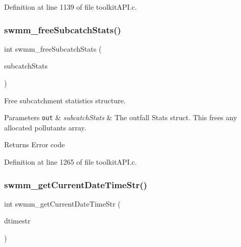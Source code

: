 Definition at line 1139 of file toolkit\+A\+P\+I.\+c.

\mbox{\label{group__tkfuncs_gaf24dfaf8bcd92298782f2449aa18a2f5}} 
\subsubsection{\texorpdfstring{swmm\+\_\+free\+Subcatch\+Stats()}{swmm\_freeSubcatchStats()}}
{\footnotesize\ttfamily int swmm\+\_\+free\+Subcatch\+Stats (\begin{DoxyParamCaption}\item[{\hyperlink{struct_s_m___subcatch_stats}{S\+M\+\_\+\+Subcatch\+Stats} $\ast$}]{subcatch\+Stats }\end{DoxyParamCaption})}



Free subcatchment statistics structure. 


\begin{DoxyParams}[1]{Parameters}
\mbox{\tt out}  & {\em subcatch\+Stats} & The outfall Stats struct. This frees any allocated pollutants array. \\
\hline
\end{DoxyParams}
\begin{DoxyReturn}{Returns}
Error code 
\end{DoxyReturn}


Definition at line 1265 of file toolkit\+A\+P\+I.\+c.

\mbox{\label{group__tkfuncs_ga1035b4f45546c1c90da4dafda7e3677d}} 
\subsubsection{\texorpdfstring{swmm\+\_\+get\+Current\+Date\+Time\+Str()}{swmm\_getCurrentDateTimeStr()}}
{\footnotesize\ttfamily int swmm\+\_\+get\+Current\+Date\+Time\+Str (\begin{DoxyParamCaption}\item[{char $\ast$}]{dtimestr }\end{DoxyParamCaption})}



